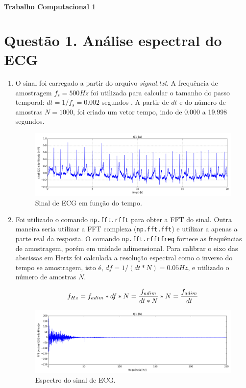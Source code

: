 \documentclass[12pt,letterpaper]{article}
\newcommand\hwnumber{1}
\begin{document}
\centerline{\textbf{\Large Trabalho Computacional \hwnumber}}

\centerline{}

\section*{Questão 1. Análise espectral do ECG}
\begin{enumerate}[label=(\alph*)]  %
    \item O sinal foi carregado a partir do arquivo \emph{signal.txt}. A frequência de amostragem ${f_s = 500 Hz}$ foi utilizada para calcular o tamanho do passo temporal: ${dt = 1/f_s = 0.002}$ segundos . A partir de ${dt}$ e do número de amostras ${N = 1000}$, foi criado um vetor tempo, indo de 0.000 a 19.998 segundos.
        \begin{figure}[H]
            \centering
            \includegraphics[width=15cm]{TC1/images/Q1_a_sinal_nfilt.png}
            \caption{Sinal de ECG em função do tempo.}
            \label{fig:1}
        \end{figure}

    \item
    Foi utilizado o comando \lstinline{np.fft.rfft} para obter a FFT do sinal. Outra maneira seria utilizar a FFT complexa (\lstinline{np.fft.fft}) e utilizar a apenas a parte real da resposta. O comando \lstinline{np.fft.rfftfreq} fornece as frequências de amostragem, porém em unidade adimensional. Para calibrar o eixo das abscissas em Hertz foi calculada a resolução espectral como o inverso do tempo se amostragem, isto é, ${df = {1/(dt*N)} = 0.05 Hz}$, e utilizado o número de amostras $N$.
    
    $${f_{Hz} = f_{adim}*df*N = {f_{adim} \over {dt*N}} *N = {f_{adim} \over dt}}$$
    
        \begin{figure}[H]
            \centering
            \includegraphics[width=15cm]{TC1/images/Q1_b_espectro_nfilt.png}
            \caption{Espectro do sinal de ECG.}
            \label{fig:2}
        \end{figure}
        

\end{enumerate}
\end{document}
